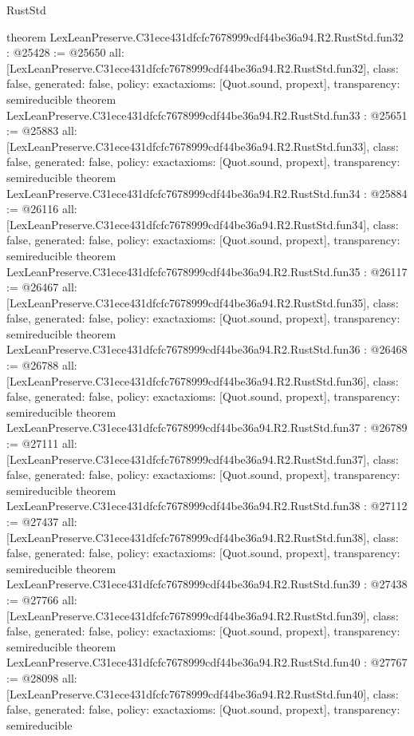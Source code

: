 \begin{lexlean}{RustStd}
\begin{coremodule}
{}
theorem LexLeanPreserve.C31ece431dfcfc7678999cdf44be36a94.R2.RustStd.fun32 : @25428 := @25650 {
  all: [LexLeanPreserve.C31ece431dfcfc7678999cdf44be36a94.R2.RustStd.fun32],
  class: false,
  generated: false,
  policy: exact{axioms: [Quot.sound, propext]},
  transparency: semireducible
}
theorem LexLeanPreserve.C31ece431dfcfc7678999cdf44be36a94.R2.RustStd.fun33 : @25651 := @25883 {
  all: [LexLeanPreserve.C31ece431dfcfc7678999cdf44be36a94.R2.RustStd.fun33],
  class: false,
  generated: false,
  policy: exact{axioms: [Quot.sound, propext]},
  transparency: semireducible
}
theorem LexLeanPreserve.C31ece431dfcfc7678999cdf44be36a94.R2.RustStd.fun34 : @25884 := @26116 {
  all: [LexLeanPreserve.C31ece431dfcfc7678999cdf44be36a94.R2.RustStd.fun34],
  class: false,
  generated: false,
  policy: exact{axioms: [Quot.sound, propext]},
  transparency: semireducible
}
theorem LexLeanPreserve.C31ece431dfcfc7678999cdf44be36a94.R2.RustStd.fun35 : @26117 := @26467 {
  all: [LexLeanPreserve.C31ece431dfcfc7678999cdf44be36a94.R2.RustStd.fun35],
  class: false,
  generated: false,
  policy: exact{axioms: [Quot.sound, propext]},
  transparency: semireducible
}
theorem LexLeanPreserve.C31ece431dfcfc7678999cdf44be36a94.R2.RustStd.fun36 : @26468 := @26788 {
  all: [LexLeanPreserve.C31ece431dfcfc7678999cdf44be36a94.R2.RustStd.fun36],
  class: false,
  generated: false,
  policy: exact{axioms: [Quot.sound, propext]},
  transparency: semireducible
}
theorem LexLeanPreserve.C31ece431dfcfc7678999cdf44be36a94.R2.RustStd.fun37 : @26789 := @27111 {
  all: [LexLeanPreserve.C31ece431dfcfc7678999cdf44be36a94.R2.RustStd.fun37],
  class: false,
  generated: false,
  policy: exact{axioms: [Quot.sound, propext]},
  transparency: semireducible
}
theorem LexLeanPreserve.C31ece431dfcfc7678999cdf44be36a94.R2.RustStd.fun38 : @27112 := @27437 {
  all: [LexLeanPreserve.C31ece431dfcfc7678999cdf44be36a94.R2.RustStd.fun38],
  class: false,
  generated: false,
  policy: exact{axioms: [Quot.sound, propext]},
  transparency: semireducible
}
theorem LexLeanPreserve.C31ece431dfcfc7678999cdf44be36a94.R2.RustStd.fun39 : @27438 := @27766 {
  all: [LexLeanPreserve.C31ece431dfcfc7678999cdf44be36a94.R2.RustStd.fun39],
  class: false,
  generated: false,
  policy: exact{axioms: [Quot.sound, propext]},
  transparency: semireducible
}
theorem LexLeanPreserve.C31ece431dfcfc7678999cdf44be36a94.R2.RustStd.fun40 : @27767 := @28098 {
  all: [LexLeanPreserve.C31ece431dfcfc7678999cdf44be36a94.R2.RustStd.fun40],
  class: false,
  generated: false,
  policy: exact{axioms: [Quot.sound, propext]},
  transparency: semireducible
}
\end{coremodule}
\end{lexlean}
